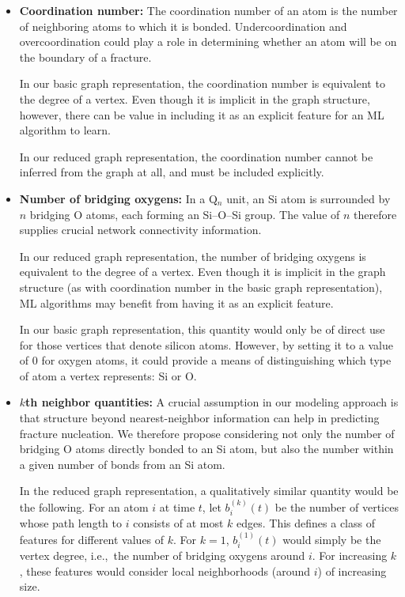 \begin{itemize}
    \item \textbf{Coordination number:} The coordination number of an atom is the number of neighboring atoms to which it is bonded. Undercoordination and overcoordination could play a role in determining whether an atom will be on the boundary of a fracture.
    
    In our basic graph representation, the coordination number is equivalent to the degree of a vertex.  Even though it is implicit in the graph structure, however, there can be value in including it as an explicit feature for an ML algorithm to learn.
    
    In our reduced graph representation, the coordination number cannot be inferred from the graph at all, and must be included explicitly.

    \item\textbf{Number of bridging oxygens:} In a Q$_n$ unit, an Si atom is surrounded by $n$ bridging O atoms, each forming an Si--O--Si group.  The value of $n$ therefore supplies crucial network connectivity information. 
    
    In our reduced graph representation, the number of bridging oxygens is equivalent to the degree of a vertex.  Even though it is implicit in the graph structure (as with coordination number in the basic graph representation), ML algorithms may benefit from having it as an explicit feature.
    
    In our basic graph representation, this quantity would only be of direct use for those vertices that denote silicon atoms.  However, by setting it to a value of 0 for oxygen atoms, it could provide a means of distinguishing which type of atom a vertex represents: Si or O.

    \item\textbf{$k$th neighbor quantities:} A crucial assumption in our modeling approach is that structure beyond nearest-neighbor information can help in predicting fracture nucleation.  We therefore propose considering not only the number of bridging O atoms directly bonded to an Si atom, but also the number within a given number of bonds from an Si atom.
    
    In the reduced graph representation, a qualitatively similar quantity would be the following.  For an atom $i$ at time $t$, let $b^{(k)}_i(t)$ be the number of vertices whose path length to $i$ consists of at most $k$ edges. This defines a class of features for different values of $k$.  For $k=1$, $b^{(1)}_i(t)$ would simply be the vertex degree, i.e.,\ the number of bridging oxygens around $i$.  For increasing $k$, these features would consider local neighborhoods (around $i$) of increasing size.


\end{itemize}
